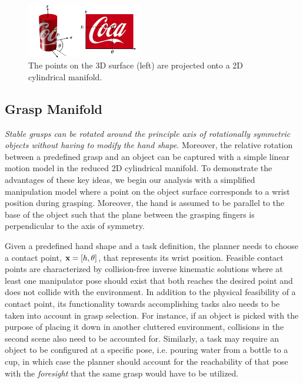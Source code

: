 \documentclass{aamas2015}
\begin{document}
\begin{figure}[ht!]
  \begin{center}
    \includegraphics[width=0.45\textwidth]{./images/unfolding.pdf} \quad
  \end{center}
  \caption{The points on the 3D surface (left) are projected onto a 2D cylindrical manifold.}
  \label{fig:unfolding} 
\end{figure}

\subsection{Grasp Manifold}

\textit{Stable grasps can be rotated around the principle axis of rotationally symmetric objects
without having to modify the hand shape}. Moreover, the relative rotation between a predefined grasp
and an object can be captured with a simple linear motion model in the reduced 2D cylindrical
manifold. To demonstrate the advantages of these key ideas, we begin our analysis with a simplified
manipulation model where a point on the object surface corresponds to a wrist position during
grasping. Moreover, the hand is assumed to be parallel to the base of the object such that the plane
between the grasping fingers is perpendicular to the axis of symmetry. 

Given a predefined hand shape and a task definition, the planner needs to choose a contact point,
$\textbf{x} = [h, \theta]$, that represents its wrist position. Feasible contact points are characterized
by collision-free inverse kinematic solutions where at least one manipulator pose should exist that 
both reaches the desired point and does not collide with the environment. In addition to the physical
feasibility of a contact point, its functionality towards accomplishing tasks also needs to be
taken into account in grasp selection. For instance, if an object is picked with the purpose of
placing it down in another cluttered environment, collisions in the second scene also need to be
accounted for. Similarly, a task may require an object to be configured at a specific pose, i.e.
pouring water from a bottle to a cup, in which case the planner should account for the reachability of
that pose with the \textit{foresight} that the same grasp would have to be utilized. 
\end{document}
